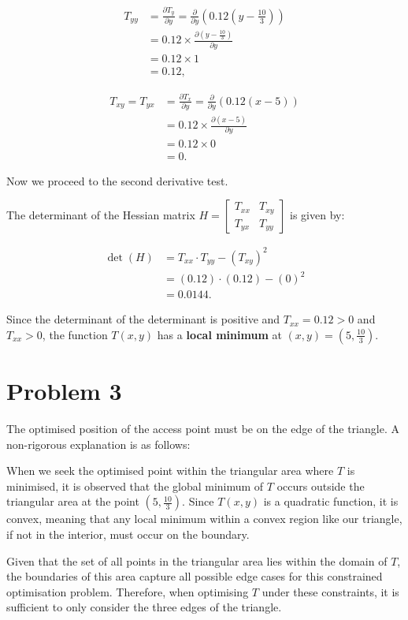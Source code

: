 \documentclass[12pt,a4paper]{article}
\begin{document}
\begin{solution}
\begin{align*}
    T_{yy} &= \frac{\partial T_y}{\partial y} = \frac{\partial}{\partial y} \left(0.12(y - \frac{10}{3})\right) \\
    &= 0.12 \times \frac{\partial (y - \frac{10}{3})}{\partial y} \\
    &= 0.12 \times 1 \\
    &= 0.12,
\end{align*}

\begin{align*}
    T_{xy} = T_{yx} &= \frac{\partial T_x}{\partial y} = \frac{\partial}{\partial y} \left(0.12(x - 5)\right) \\
    &= 0.12 \times \frac{\partial (x - 5)}{\partial y} \\
    &= 0.12 \times 0 \\
    &= 0.
\end{align*}

Now we proceed to the second derivative test.

The determinant of the Hessian matrix $H = 
\begin{bmatrix}
    T_{xx}&T_{xy}\\
    T_{yx}&T_{yy}
\end{bmatrix}$ is given by:

\begin{align*}
    \det(H) &= T_{xx} \cdot T_{yy} - (T_{xy})^2 \\
    &= (0.12) \cdot (0.12) - (0)^2 \\
    &= 0.0144.
\end{align*}

Since the determinant of the determinant is positive and \( T_{xx} = 0.12 > 0 \) and $T_{xx} > 0$, the function \( T(x, y) \) has a \textbf{local minimum} at \( \left(x, y\right) = \left(5, \frac{10}{3}\right) \).
\end{solution}


\section*{Problem 3}
\begin{solution}
The optimised position of the access point must be on the edge of the triangle. A non-rigorous explanation is as follows:

When we seek the optimised point within the triangular area where \( T \) is minimised, it is observed that the global minimum of \( T \) occurs outside the triangular area at the point \(\left(5, \frac{10}{3}\right)\). Since \( T(x, y) \) is a quadratic function, it is convex, meaning that any local minimum within a convex region like our triangle, if not in the interior, must occur on the boundary.

Given that the set of all points in the triangular area lies within the domain of \( T \), the boundaries of this area capture all possible edge cases for this constrained optimisation problem. Therefore, when optimising \( T \) under these constraints, it is sufficient to only consider the three edges of the triangle.
\end{solution}
\end{document}
